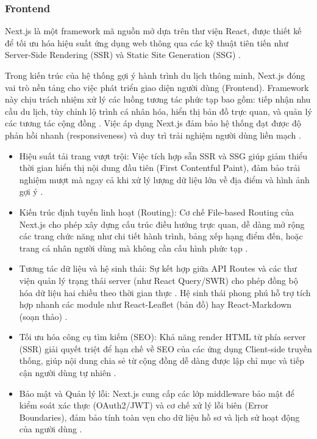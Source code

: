 \subsubsection{Frontend}

Next.js là một framework mã nguồn mở dựa trên thư viện React, được thiết kế để tối ưu hóa hiệu suất ứng dụng web thông qua các kỹ thuật tiên tiến như Server-Side Rendering (SSR) và Static Site Generation (SSG) \cite{nextjs_docs}. 

Trong kiến trúc của hệ thống gợi ý hành trình du lịch thông minh, Next.js đóng vai trò nền tảng cho việc phát triển giao diện người dùng (Frontend). Framework này chịu trách nhiệm xử lý các luồng tương tác phức tạp bao gồm: tiếp nhận nhu cầu du lịch, tùy chỉnh lộ trình cá nhân hóa, hiển thị bản đồ trực quan, và quản lý các tương tác cộng đồng \cite{fabrizio2022}. Việc áp dụng Next.js đảm bảo hệ thống đạt được độ phản hồi nhanh (responsiveness) và duy trì trải nghiệm người dùng liền mạch \cite{nextjs_learn}.

\begin{itemize}
    \item Hiệu suất tải trang vượt trội: 
    Việc tích hợp sẵn SSR và SSG giúp giảm thiểu thời gian hiển thị nội dung đầu tiên (First Contentful Paint), đảm bảo trải nghiệm mượt mà ngay cả khi xử lý lượng dữ liệu lớn về địa điểm và hình ảnh gợi ý \cite{shah2023}.
    
    \item Kiến trúc định tuyến linh hoạt (Routing): 
    Cơ chế File-based Routing của Next.js cho phép xây dựng cấu trúc điều hướng trực quan, dễ dàng mở rộng các trang chức năng như chi tiết hành trình, bảng xếp hạng điểm đến, hoặc trang cá nhân người dùng mà không cần cấu hình phức tạp \cite{hansen2020}.
    
    \item Tương tác dữ liệu và hệ sinh thái: 
    Sự kết hợp giữa API Routes và các thư viện quản lý trạng thái server (như React Query/SWR) cho phép đồng bộ hóa dữ liệu hai chiều theo thời gian thực \cite{thakur2023}. Hệ sinh thái phong phú hỗ trợ tích hợp nhanh các module như React-Leaflet (bản đồ) hay React-Markdown (soạn thảo) \cite{waqar2021}.
    
    \item Tối ưu hóa công cụ tìm kiếm (SEO): 
    Khả năng render HTML từ phía server (SSR) giải quyết triệt để hạn chế về SEO của các ứng dụng Client-side truyền thống, giúp nội dung chia sẻ từ cộng đồng dễ dàng được lập chỉ mục và tiếp cận người dùng tự nhiên \cite{kshirsagar2022}.
    
    \item Bảo mật và Quản lý lỗi: 
    Next.js cung cấp các lớp middleware bảo mật để kiểm soát xác thực (OAuth2/JWT) và cơ chế xử lý lỗi biên (Error Boundaries), đảm bảo tính toàn vẹn cho dữ liệu hồ sơ và lịch sử hoạt động của người dùng \cite{fabrizio2022}.
\end{itemize}

